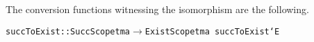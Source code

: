 \documentclass[9pt,authoryear]{sigplanconf}
\begin{document}
%
The conversion functions witnessing the isomorphism are the
    following.%


\newpage

%
{\noindent}%
%
\vphantom{$\{$}\texttt{succToExist}\texttt{\mbox{\hspace{0.50em}}}\texttt{{:}{:}}\texttt{\mbox{\hspace{0.50em}}}\texttt{SuccScope}\texttt{\mbox{\hspace{0.50em}}}\texttt{tm}\texttt{\mbox{\hspace{0.50em}}}\texttt{a}\texttt{\mbox{\hspace{0.50em}}}\texttt{$ \rightarrow $}\texttt{\mbox{\hspace{0.50em}}}\texttt{ExistScope}\texttt{\mbox{\hspace{0.50em}}}\texttt{tm}\texttt{\mbox{\hspace{0.50em}}}\texttt{a}\texttt{{\nopagebreak \newline%
}\vphantom{$\{$}}\texttt{succToExist}\texttt{\mbox{\hspace{0.50em}}}\texttt{{\char `\=}}\texttt{\mbox{\hspace{0.50em}}}\texttt{E}\texttt{\mbox{\hspace{0.50em}}}\texttt{\makebox[1.22ex][l]{$ {(} $}}\texttt{\makebox[1.22ex][r]{$ {)} $}}\texttt{{\nopagebreak \newline%
}\vphantom{$\{$}}%
\end{document}
